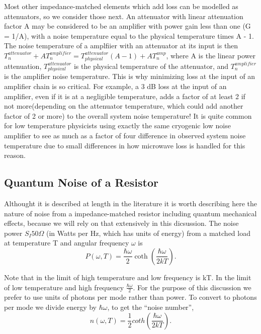 \documentclass{report}
\begin{document}
	Most other impedance-matched elements which add loss can be modelled as attenuators, so we consider those next.  An attenuator with linear attenuation factor A may be considered to be an amplifier with power gain less than one (G = 1/A), with a noise temperature equal to the physical temperature times A - 1.  The noise temperature of a amplfiier with an attenuator at its input is then $T^{attenuator}_n + AT^{amplifier}_{n} = T^{attenuator}_{physical}(A-1) + AT_n^{amp}$, where A is the linear power attenuation, $T^{attenuator}_{physical}$ is the physical temperature of the attenuator, and $T_n^{amplifier}$ is the amplifier noise temperature.  This is why minimizing loss at the input of an amplifier chain is so critical.  For example, a 3 dB loss at the input of an amplifier, even if it is at a negligible temperature, adds a factor of at least 2 if not more(depending on the attenuator temperature, which could add another factor of 2 or more) to the overall system noise temperature!  It is quite common for low temperature physicists using exactly the same cryogenic low noise amplifier to see as much as a factor of four difference in observed system noise temperature due to small differences in how microwave loss is handled for this reason.  

	\subsection{Quantum Noise of a Resistor}

	Althought it is described at length in the literature it is worth describing here the nature of noise from a impedance-matched resistor including quantum mechanical effects, because we will rely on that extensively in this dicsussion.  The noise power $S_I50 \Omega$ (in Watts per Hz, which has units of energy) from a matched load at temperature T and angular frequency $\omega$ is
\begin{equation}
P(\omega,T)=\frac{\hbar\omega}{2}\coth{\left(\frac{\hbar\omega}{2kT}\right)}.
\end{equation}

Note that in the limit of high temperature and low frequency is kT.  In the limit of low temperature and high frequency $\frac{\hbar\omega}{2}$.  For the purpose of this discussion we prefer to use units of photons per mode rather than power.  To convert to photons per mode we divide energy by $\hbar\omega$, to get the ``noise number'', 
\begin{equation}
n(\omega,T)=\frac{1}{2}coth{\left(\frac{\hbar\omega}{2kT}\right)}.
\end{equation}
\end{document}
